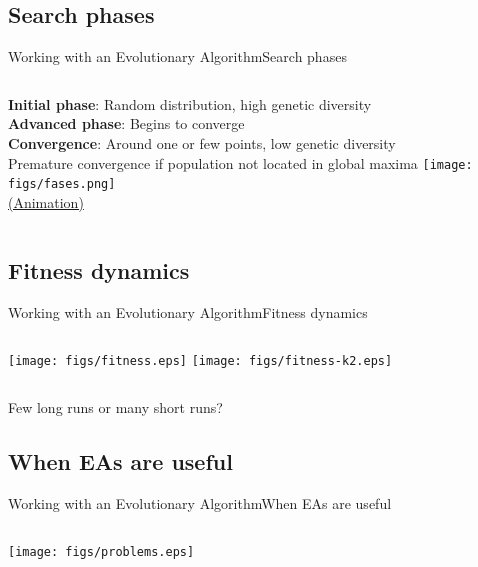 \documentclass[10pt,compress]{beamer} %
\begin{document}
\subsection{Search phases}
\begin{frame}{Working with an Evolutionary Algorithm}{Search phases}
    \begin{columns}
	   \textbf{Initial phase}: Random distribution, high genetic diversity\\
	   \textbf{Advanced phase}: Begins to converge\\
	   \textbf{Convergence}: Around one or few points, low genetic diversity\\
	   \bigskip
	   Premature convergence if population not located in global maxima
		\texttt{[image: figs/fases.png]}\\
		\centering\href{https://upload.wikimedia.org/wikipedia/commons/f/fe/Visualization\_of\_a\_population\_evolving\_in\_a\_static\_fitness\_landscape.gif}{(Animation)}
	\end{columns}
\end{frame}

\subsection{Fitness dynamics}
\begin{frame}{Working with an Evolutionary Algorithm}{Fitness dynamics}
    \begin{columns}
		\texttt{[image: figs/fitness.eps]}
		\texttt{[image: figs/fitness-k2.eps]}
	\end{columns}
	Few long runs or many short runs?
\end{frame}

\subsection{When  EAs are useful}
\begin{frame}{Working with an Evolutionary Algorithm}{When EAs are useful}
    \begin{columns}
		\texttt{[image: figs/problems.eps]}
	\end{columns}
\end{frame}
\end{document}
